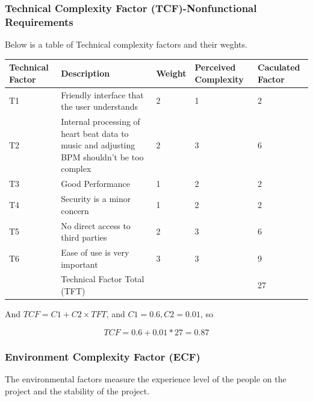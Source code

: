 \documentclass[letterpaper,english, 12pt]{scrreprt}
\begin{document}
\subsubsection{Technical Complexity Factor (TCF)-Nonfunctional Requirements}

Below is a table of Technical complexity factors and their weghts.

\begin{center}
        \begin{tabular}{|C{2cm}|C{5cm}|C{1cm}|C{1cm}|C{1cm}|}
                \hline
                        Technical Factor & Description & Weight & Perceived Complexity & Caculated Factor \\
                \hline
                        T1 & Friendly interface that the user understands & 2 & 1 & 2 \\
                \hline
                        T2 & Internal processing of heart beat data to music and adjusting BPM shouldn't be too complex & 2 & 3 & 6\\
                \hline
                        T3 & Good Performance & 1 & 2 & 2 \\
                \hline
                        T4 & Security is a minor concern & 1 & 2 & 2 \\
                \hline
                        T5 & No direct access to third parties & 2 & 3 & 6 \\
                \hline
                        T6 & Ease of use is very important & 3 & 3 & 9\\
                \hline   
                        & Technical Factor Total (TFT) & & & 27 \\
                \hline
        \end{tabular}
\end{center}

And $TCF = C1 + C2 \times TFT$, and $C1 = 0.6, C2 = 0.01$, so

\begin{equation}
TCF = 0.6 + 0.01*27 = 0.87
\end{equation}

\subsubsection{Environment Complexity Factor (ECF)}

The environmental factors measure the experience level of the people on the project and the stability of the project. 
\end{document}
